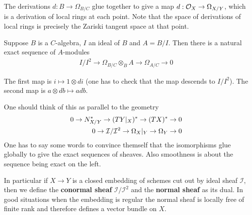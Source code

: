 \documentclass[12pt]{article}
\begin{document}
\hfill

The derivations $d:B\to \Omega_{B/C}$ glue together to give a map $d:{\mathcal{O}}_X \to \Omega_{X/Y}$, which is a
derivation of local rings at each point. Note that the space of derivations of local rings is precisely the 
Zariski tangent space at that point.

\begin{theorem}
     Suppose $B$ is a $C$-algebra, $I$ an ideal of $B$ and $A = B/I$.
    Then there is a natural exact sequence of $A$-modules \begin{align*}
        I/I^2\to \Omega_{B/C}\otimes_B A\to \Omega_{A/C}\to 0
    \end{align*}
\end{theorem}
The first map is $i \mapsto 1\otimes di$ (one has to check that the map descends to $I/I^2$). The second map is $a\otimes db\mapsto adb$.

One should think of this as parallel to the geometry \begin{align*}
    0\to N_{X/Y}^*\to (TY|_X)^*\to (TX)^*\to 0 \\
    0 \to {\mathcal{I}}/{\mathcal{I}}^2\to \Omega_{X}\vert_Y\to \Omega_Y \to 0
\end{align*}
One has to say some words to convince themself that the isomorphisms glue globally to give the exact sequences of sheaves. Also smoothness is about the sequence being exact on the left.

\hfill

In particular if $X\to Y$ is a closed embedding of schemes cut out by ideal sheaf $\mathcal{I}$,
then we define the \textbf{conormal sheaf} $\mathcal{I}/\mathcal{I}^2$ and the \textbf{normal sheaf} as its dual.
In good situations when the embedding is regular the normal sheaf is locally free of finite rank and therefore 
defines a vector bundle on $X$.
\end{document}
